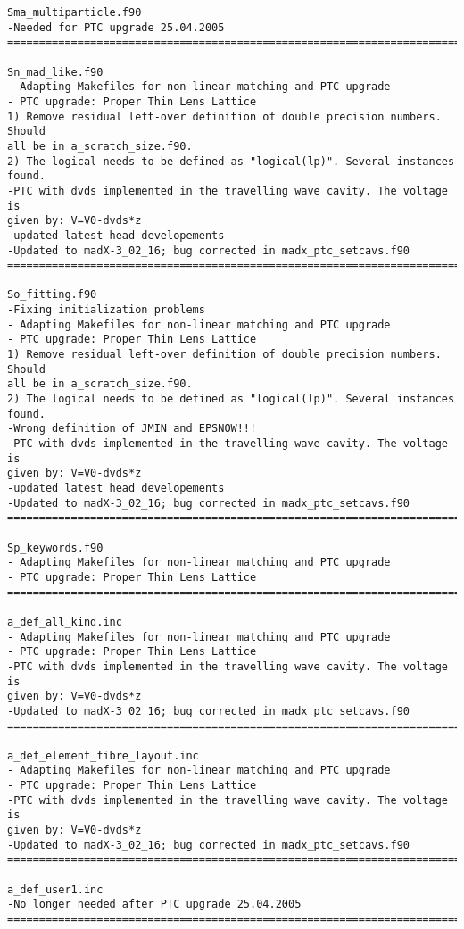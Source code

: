 \begin{verbatim}
Sma_multiparticle.f90
-Needed for PTC upgrade 25.04.2005
=============================================================================

Sn_mad_like.f90
- Adapting Makefiles for non-linear matching and PTC upgrade
- PTC upgrade: Proper Thin Lens Lattice
1) Remove residual left-over definition of double precision numbers. Should
all be in a_scratch_size.f90.
2) The logical needs to be defined as "logical(lp)". Several instances found.
-PTC with dvds implemented in the travelling wave cavity. The voltage is
given by: V=V0-dvds*z
-updated latest head developements
-Updated to madX-3_02_16; bug corrected in madx_ptc_setcavs.f90
=============================================================================

So_fitting.f90
-Fixing initialization problems
- Adapting Makefiles for non-linear matching and PTC upgrade
- PTC upgrade: Proper Thin Lens Lattice
1) Remove residual left-over definition of double precision numbers. Should
all be in a_scratch_size.f90.
2) The logical needs to be defined as "logical(lp)". Several instances found.
-Wrong definition of JMIN and EPSNOW!!!
-PTC with dvds implemented in the travelling wave cavity. The voltage is
given by: V=V0-dvds*z
-updated latest head developements
-Updated to madX-3_02_16; bug corrected in madx_ptc_setcavs.f90
=============================================================================

Sp_keywords.f90
- Adapting Makefiles for non-linear matching and PTC upgrade
- PTC upgrade: Proper Thin Lens Lattice
=============================================================================

a_def_all_kind.inc
- Adapting Makefiles for non-linear matching and PTC upgrade
- PTC upgrade: Proper Thin Lens Lattice
-PTC with dvds implemented in the travelling wave cavity. The voltage is
given by: V=V0-dvds*z
-Updated to madX-3_02_16; bug corrected in madx_ptc_setcavs.f90
=============================================================================

a_def_element_fibre_layout.inc
- Adapting Makefiles for non-linear matching and PTC upgrade
- PTC upgrade: Proper Thin Lens Lattice
-PTC with dvds implemented in the travelling wave cavity. The voltage is
given by: V=V0-dvds*z
-Updated to madX-3_02_16; bug corrected in madx_ptc_setcavs.f90
=============================================================================

a_def_user1.inc
-No longer needed after PTC upgrade 25.04.2005
=============================================================================


\end{verbatim}
